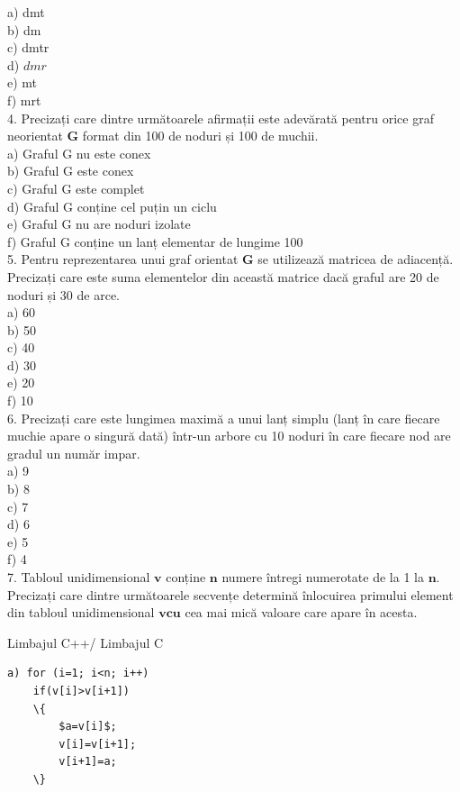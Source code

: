 \documentclass[10pt]{article}
\begin{document}
a) dmt\\
b) dm\\
c) dmtr\\
d) $d m r$\\
e) mt\\
f) mrt\\
4. Precizați care dintre următoarele afirmații este adevărată pentru orice graf neorientat $\mathbf{G}$ format din 100 de noduri și 100 de muchii.\\
a) Graful G nu este conex\\
b) Graful G este conex\\
c) Graful G este complet\\
d) Graful G conține cel puțin un ciclu\\
e) Graful G nu are noduri izolate\\
f) Graful G conține un lanț elementar de lungime 100\\
5. Pentru reprezentarea unui graf orientat $\mathbf{G}$ se utilizează matricea de adiacență. Precizați care este suma elementelor din această matrice dacă graful are 20 de noduri și 30 de arce.\\
a) 60\\
b) 50\\
c) 40\\
d) 30\\
e) 20\\
f) 10\\
6. Precizați care este lungimea maximă a unui lanț simplu (lanț în care fiecare muchie apare o singură dată) într-un arbore cu 10 noduri în care fiecare nod are gradul un număr impar.\\
a) 9\\
b) 8\\
c) 7\\
d) 6\\
e) 5\\
f) 4\\
7. Tabloul unidimensional $\mathbf{v}$ conține $\mathbf{n}$ numere întregi numerotate de la 1 la $\mathbf{n}$. Precizați care dintre următoarele secvențe determină înlocuirea primului element din tabloul unidimensional $\mathbf{v} \mathbf{c u}$ cea mai mică valoare care apare în acesta.

Limbajul C++/ Limbajul C

\begin{verbatim}
a) for (i=1; i<n; i++)
    if(v[i]>v[i+1])
    \{
        $a=v[i]$;
        v[i]=v[i+1];
        v[i+1]=a;
    \}
\end{verbatim}
\end{document}
